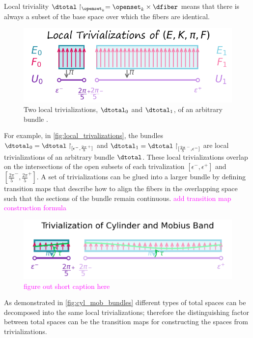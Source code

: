 \documentclass[10pt,journal,compsoc]{IEEEtran}
\newcommand{\note}[1]{\textcolor{magenta}{#1}}
\theoremstyle{definition}
\theoremstyle{remark}
\begin{document}
Local triviality $\dtotal\restriction_{\openset_{k}} = \openset_{k}\times \dfiber$ means that there is always a subset of the base space over which the fibers are identical. 
\begin{figure}[h!]
  \includegraphics[width=\columnwidth]{figures/local_trivalizations.png}
  \caption{Two local trivializations, $\dtotal_{0}$ and $\dtotal_{1}$, of an arbitrary bundle \dtotal.} 
\end{figure}

For example, in \autoref{fig:local_trivalizations}, the bundles $\dtotal_{0}=\dtotal\restriction_{[\epsilon^{-}, {\frac{2\pi}{5}}^{+}]}$ and $\dtotal_{1}=\dtotal\restriction_{[{\frac{2\pi}{5}}^{-}, \epsilon^{-}]}$ are local trivializations of an arbitrary bundle $\dtotal$. These local trivializations overlap on the intersections of the open subsets of each trivalization $[\epsilon^{-}, \epsilon^{+}]$ and $[{\frac{2\pi}{5}}^{-}, {\frac{2\pi}{5}}^{+}]$. A set of trivializations can be glued into a larger bundle by defining transition maps that describe how to align the fibers in the overlapping space such that the sections of the bundle remain continuous. 
\note{add transition map construction formula} 

\begin{figure}[h!]
  \includegraphics[width=1\columwidth]{figures/cyl_mob.png}
  \caption{\note{figure out short caption here}\label{fig:cyl_mob_bundles}}
\end{figure}
As demonstrated in \autoref{fig:cyl_mob_bundles} different types of total spaces can be decomposed into the same local trivializations; therefore the distinguishing factor between total spaces can be the transition maps for constructing the spaces from trivializations. 
\end{document}
